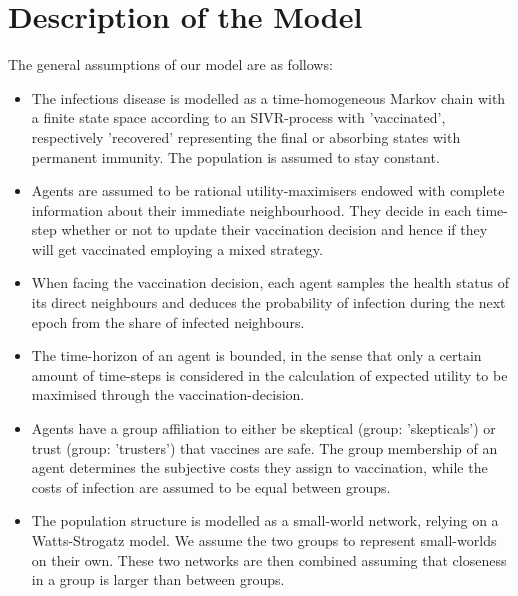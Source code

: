 \documentclass[11pt]{article}
\begin{document}
\section{Description of the Model}
The general assumptions of our model are as follows:
\begin{itemize}
\item{The infectious disease is modelled as a time-homogeneous Markov chain with a finite state space according to an SIVR-process with 'vaccinated', respectively 'recovered' representing the final or absorbing states with permanent immunity. The population is assumed to stay constant.}
\item{Agents are assumed to be rational utility-maximisers endowed with complete information about their immediate neighbourhood. They decide in each time-step whether or not to update their vaccination decision and hence if they will get vaccinated employing a mixed strategy.}
\item{When facing the vaccination decision, each agent samples the health status of its direct neighbours and deduces the probability of infection during the next epoch from the share of infected neighbours.}
\item{The time-horizon of an agent is bounded, in the sense that only a certain amount of time-steps is considered in the calculation of expected utility to be maximised through the vaccination-decision.}
\item{Agents have a group affiliation to either be skeptical (group: 'skepticals') or trust (group: 'trusters') that vaccines are safe. The group membership of an agent determines the subjective costs they assign to vaccination, while the costs of infection are assumed to be equal between groups.}
\item{The population structure is modelled as a small-world network, relying on a Watts-Strogatz model. We assume the two groups to represent small-worlds on their own. These two networks are then combined assuming that closeness in a group is larger than between groups.}
\end{itemize}
\end{document}
